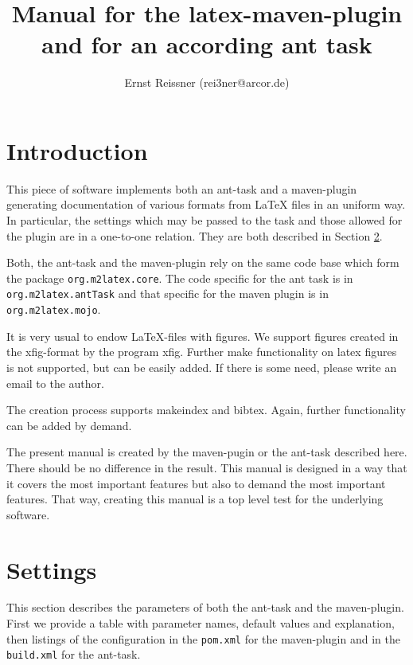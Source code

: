 \documentclass[12pt]{article}
\title{Manual for the latex-maven-plugin and for an according ant task }
\author{Ernst Reissner (rei3ner@arcor.de)}
\begin{document}
\maketitle

\tableofcontents

\section{Introduction}

This piece of software implements both an ant-task and a maven-plugin 
generating documentation of various formats from LaTeX files 
in an uniform way. 
In particular, the settings which may be passed to the task 
and those allowed for the plugin are in a one-to-one relation. 
They are both described in Section \ref{sec:settings}. 

Both, the ant-task and the maven-plugin rely on the same code base 
which form the package {\tt org.m2latex.core}. 
The code specific for the ant task is in {\tt org.m2latex.antTask} 
and that specific for the maven plugin is in {\tt org.m2latex.mojo}. 

It is very usual to endow LaTeX-files with figures. 
We support figures created in the xfig-format 
by the program xfig. 
Further make functionality on latex figures is not supported, 
but can be easily added. 
If there is some need, please write an email to the author. 

The creation process supports makeindex and bibtex. 
Again, further functionality can be added by demand. 

The present manual is created by the maven-pugin or the ant-task 
described here. 
There should be no difference in the result. 
This manual is designed in a way that it covers the most important features 
but also to demand the most important features. 
That way, creating this manual is a top level test 
for the underlying software. 


\section{Settings}\label{sec:settings}

This section describes the parameters 
of both the ant-task and the maven-plugin. 
First we provide a table with parameter names, default values 
and explanation, then listings of the configuration 
in the {\tt pom.xml} for the maven-plugin 
and in the {\tt build.xml} for the ant-task. 
\end{document}
